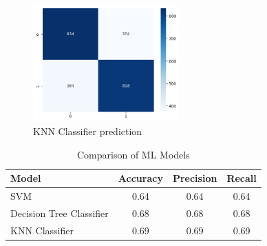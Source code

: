 \begin{figure}
\includegraphics[width=0.5\textwidth]{img/knn_pred.png}
\caption{KNN Classifier prediction}
\label{fig:knn_cm}
\end{figure}

\begin{table}
    \centering
    \caption{Comparison of ML Models}
    \label{tab:ml_comparison}
    \begin{tabular}{lccc}
        \hline
        \textbf{Model} & \textbf{Accuracy} & \textbf{Precision} & \textbf{Recall} \\
        \hline
        SVM & 0.64 & 0.64 & 0.64 \\
        Decision Tree Classifier & 0.68 & 0.68 & 0.68 \\
        KNN Classifier & 0.69 & 0.69 & 0.69 \\
        \hline
    \end{tabular}
\end{table}